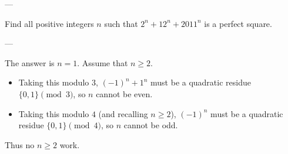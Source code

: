 
---

Find all positive integers $n$ such that $2^n+12^n+2011^n$ is a perfect square.

---

The answer is $n=1$. Assume that $n\ge2$.
\begin{itemize}
    \item Taking this modulo $3$, $(-1)^n+1^n$ must be a quadratic residue $\{0,1\}\pmod3$, so $n$ cannot be even.
    \item Taking this modulo $4$ (and recalling $n\ge2$), $(-1)^n$ must be a quadratic residue $\{0,1\}\pmod4$, so $n$ cannot be odd.
\end{itemize}
Thus no $n\ge2$ work.

